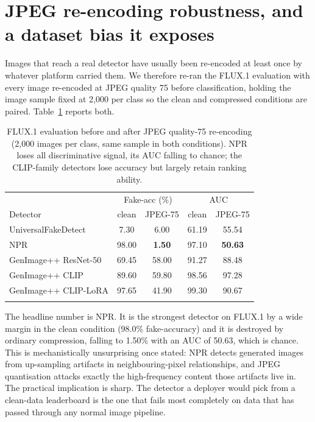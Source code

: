 \documentclass[3p,times,procedia]{elsarticle}
\begin{document}
\section{JPEG re-encoding robustness, and a dataset bias it exposes}
\label{sec:robustness}

Images that reach a real detector have usually been re-encoded at least
once by whatever platform carried them. We therefore re-ran the FLUX.1
evaluation with every image re-encoded at JPEG quality 75 before
classification, holding the image sample fixed at 2{,}000 per class so the
clean and compressed conditions are paired. Table~\ref{tab:jpeg} reports
both.

\begin{table}[h]
\caption{FLUX.1 evaluation before and after JPEG quality-75 re-encoding
(2{,}000 images per class, same sample in both conditions). NPR loses all
discriminative signal, its AUC falling to chance; the CLIP-family detectors
lose accuracy but largely retain ranking ability.}
\label{tab:jpeg}
\begin{tabular*}{\hsize}{@{\extracolsep{\fill}}lcccc@{}}
\toprule
& \multicolumn{2}{c}{Fake-acc (\%)} & \multicolumn{2}{c}{AUC} \\
Detector & clean & JPEG-75 & clean & JPEG-75 \\
\colrule
UniversalFakeDetect & 7.30 & 6.00 & 61.19 & 55.54 \\
NPR & 98.00 & \textbf{1.50} & 97.10 & \textbf{50.63} \\
GenImage++ ResNet-50 & 69.45 & 58.00 & 91.27 & 88.48 \\
GenImage++ CLIP & 89.60 & 59.80 & 98.56 & 97.28 \\
GenImage++ CLIP-LoRA & 97.65 & 41.90 & 99.30 & 90.67 \\
\botrule
\end{tabular*}
\end{table}

The headline number is NPR. It is the strongest detector on FLUX.1 by a
wide margin in the clean condition (98.0\% fake-accuracy) and it is
destroyed by ordinary compression, falling to 1.50\% with an AUC of 50.63,
which is chance. This is mechanistically unsurprising once stated: NPR
detects generated images from up-sampling artifacts in neighbouring-pixel
relationships, and JPEG quantisation attacks exactly the high-frequency
content those artifacts live in. The practical implication is sharp. The
detector a deployer would pick from a clean-data leaderboard is the one
that fails most completely on data that has passed through any normal
image pipeline.
\end{document}
